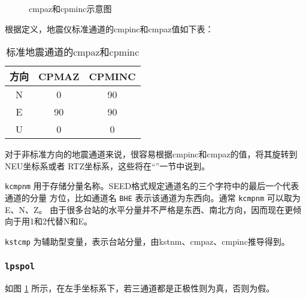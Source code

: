 \begin{figure}[H]
\centering
{}
\caption{cmpaz和cpminc示意图}
\label{fig:cmpaz-cmpinc}
\end{figure}

根据定义，地震仪标准通道的cmpinc和cmpaz值如下表：
\begin{table}[H]
\caption{标准地震通道的cmpaz和cpminc}
\label{table:neu-cmpaz-cmpinc}
\centering
\begin{tabular}{ccc}
\toprule
方向    &   CPMAZ   &   CPMINC      \\
\midrule
N       &   0       &   90          \\
E       &   90      &   90          \\
U       &   0       &   0           \\
\bottomrule
\end{tabular}
\end{table}

对于非标准方向的地震通道来说，很容易根据cmpinc和cmpaz的值，将其旋转到NEU坐标系或者
RTZ坐标系，这些将在``''一节中说到。

\texttt{kcmpnm} 用于存储分量名称。SEED格式规定通道名的三个字符中的最后一个代表通道的分量
方位，比如通道名 \texttt{BHE} 表示该通道为东西向。通常 \texttt{kcmpnm} 可以取为E、N、Z。
由于很多台站的水平分量并不严格是东西、南北方向，因而现在更倾向于用1和2代替N和E。

\texttt{kstcmp} 为辅助型变量，表示台站分量，由kstnm、cmpaz、cmpinc推导得到。

\subsubsection{\texttt{lpspol}}
如图 \ref{fig:cmpaz-cmpinc} 所示，在左手坐标系下，若三通道都是正极性则为真，否则为假。

